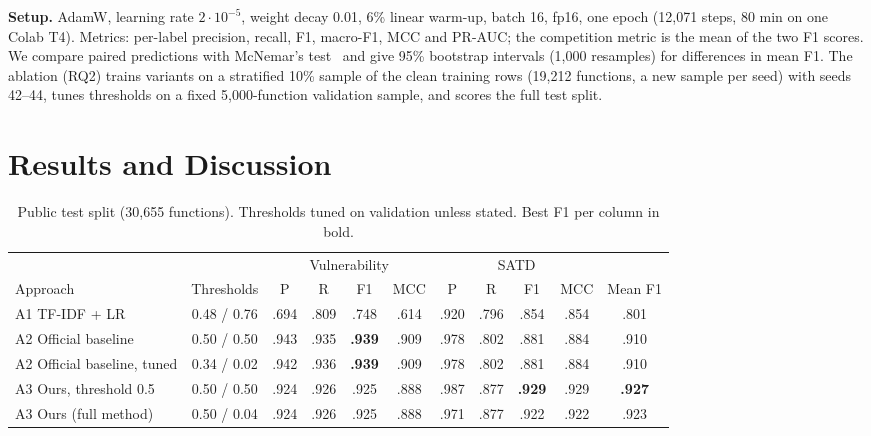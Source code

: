\documentclass[conference]{IEEEtran}
\begin{document}
\textbf{Setup.} AdamW, learning rate $2\cdot10^{-5}$, weight decay 0.01, 6\% linear warm-up, batch 16, fp16, one epoch (12,071 steps, 80 min on one Colab T4). Metrics: per-label precision, recall, F1, macro-F1, MCC and PR-AUC; the competition metric is the mean of the two F1 scores. We compare paired predictions with McNemar's test~\cite{dietterich1998} and give 95\% bootstrap intervals (1,000 resamples) for differences in mean F1. The ablation (RQ2) trains variants on a stratified 10\% sample of the clean training rows (19,212 functions, a new sample per seed) with seeds 42--44, tunes thresholds on a fixed 5,000-function validation sample, and scores the full test split.

\section{Results and Discussion}
\begin{table}[t]
\centering
\caption{Public test split (30,655 functions). Thresholds tuned on validation unless stated. Best F1 per column in bold.}
\label{tab:main}
\begin{tabular}{lcccccccccc}
\toprule
 & & \multicolumn{4}{c}{Vulnerability} & \multicolumn{4}{c}{SATD} & \\
\cmidrule(lr){3-6}\cmidrule(lr){7-10}
Approach & Thresholds & P & R & F1 & MCC & P & R & F1 & MCC & Mean F1 \\
\midrule
A1 TF-IDF + LR & 0.48 / 0.76 & .694 & .809 & .748 & .614 & .920 & .796 & .854 & .854 & .801 \\
A2 Official baseline & 0.50 / 0.50 & .943 & .935 & \textbf{.939} & .909 & .978 & .802 & .881 & .884 & .910 \\
A2 Official baseline, tuned & 0.34 / 0.02 & .942 & .936 & \textbf{.939} & .909 & .978 & .802 & .881 & .884 & .910 \\
A3 Ours, threshold 0.5 & 0.50 / 0.50 & .924 & .926 & .925 & .888 & .987 & .877 & \textbf{.929} & .929 & \textbf{.927} \\
A3 Ours (full method) & 0.50 / 0.04 & .924 & .926 & .925 & .888 & .971 & .877 & .922 & .922 & .923 \\
\bottomrule
\end{tabular}
\end{table}
\end{document}
